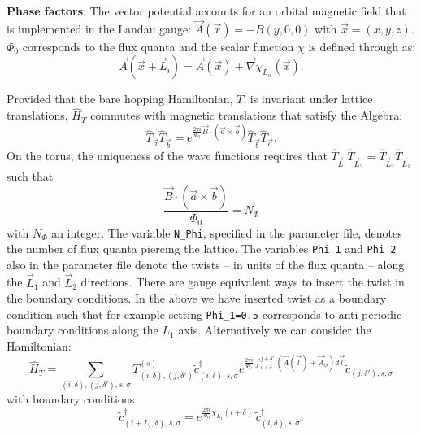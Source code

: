 \noindent
\textbf{Phase factors}.  
The vector potential accounts for an orbital magnetic field that is implemented  in the Landau  gauge:  $\vec{A}(\vec{x})  =  -B(y,0,0) $ with $ \vec{x} = (x,y,z)$. $\Phi_0$ corresponds to the flux  quanta and the scalar function $\chi$ is defined  through as:
\begin{equation}
	\vec{A}( \vec{x} + \vec{L}_{i} )  = \vec{A}( \vec{x} )   +  \vec{\nabla} \chi_{L_{\alpha}}(\vec{x}). 
\end{equation}

 Provided that the bare hopping Hamiltonian, $T$,  is invariant under lattice translations, $\hat{H}_T$ commutes with magnetic translations  that satisfy the  Algebra: 
\begin{equation}
	\hat{T}_{\vec{a}} \hat{T}_{\vec{b}} =  e^{ \frac{2 \pi i}{\Phi_0}   \vec{B} \cdot \left( \vec{a} \times \vec{b} \right) }  \hat{T}_{\vec{b}} \hat{T}_{\vec{a}}. 
\end{equation}
On the  torus, the uniqueness of the wave functions requires that  $\hat{T}_{\vec{L}_1} \hat{T}_{\vec{L}_2}  =   \hat{T}_{\vec{L}_2} \hat{T}_{\vec{L}_1} $ such
that
\begin{equation}
	 \frac{\vec{B} \cdot \left( \vec{a} \times \vec{b}  \right) }{\Phi_0 } = N_{\Phi}   
\end{equation}
with  $N_\Phi $ an integer.  The variable \texttt{N\_Phi},   specified in the parameter file,   denotes the number of flux quanta piercing the lattice.    The variables \texttt{Phi\_1}  and   \texttt{Phi\_2} also   in the parameter file denote  the twists  -- in units of the flux quanta  --  along the $\vec{L}_1$ and  $\vec{L}_2$ directions.     There are gauge  equivalent ways to insert the  twist in the boundary conditions. In the above we  have inserted   twist as a boundary condition such  that for example setting  \texttt{Phi\_1=0.5}  corresponds to anti-periodic boundary conditions along the $L_1$  axis.   Alternatively we  can  consider the 
Hamiltonian:
\begin{equation}
	   \hat{H}_T = \sum_{(i,\delta), (j,\delta'), s, \sigma}    T_{(i,\delta), (j,\delta')}^{(s)}    \tilde{c}^{\dagger}_{(i,\delta),s,\sigma }   e^{\frac{2 \pi i}{\Phi_0} \int_{i + \delta}^{j + \delta'} \left(  \vec{A}(\vec{l})  + \vec{A}_{\phi} \right)  d \vec{l}} \tilde{c}^{}_{(j,\delta'),s,\sigma }
\end{equation}
with boundary conditions 
\begin{equation}
	\tilde{c}^{\dagger}_{(i + L_i,\delta) ,s,\sigma }   =  e^{\frac{2 \pi i }{\Phi_0} \chi_{L_1} ( i + \delta ) } \, \tilde{c}^{\dagger}_{(i,\delta) ,s,\sigma }.
\end{equation}
